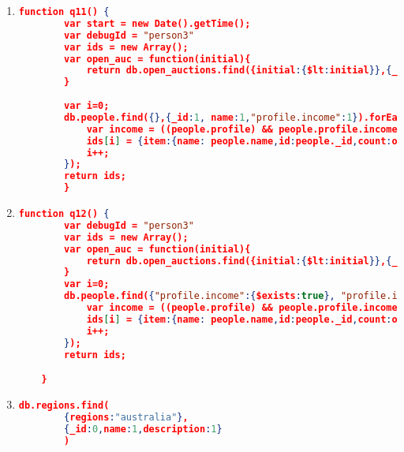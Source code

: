 \begin{enumerate}[label=Q\arabic*]
\begin{lstlisting}[language=JSON,   basicstyle=\scriptsize]
    			})
    		return prof;
    		};
        
        var ids = new Array();
    	var i = 0;
    	var allcategories = new Array();
    	db.people.aggregate([
    	{$match:{"profile.interest":{$exists:true}}},
    	{$project:{_id:1, interest:"$profile.interest"}},
    	{$unwind:"$interest"},
    	{$group:{_id:"$interest.category"}},
    	{$project:{_id:0, category:"$_id"}}
    	],{allowDiskUse:true}).forEach(function(people){
    		var catId = people.category;
    		ids[i] = {categorie:{id:catId,profile:getProfileByCategory(catId)}}
    		i++;
    	});
    	return ids;
    
    }
	\end{lstlisting}
	
	
    \item \label{mongodb-q-11}%
	\begin{lstlisting}[language=JSON,   basicstyle=\scriptsize]
	  function q11() {
    	var start = new Date().getTime();
    	var debugId = "person3"
    	var ids = new Array();
    	var open_auc = function(initial){
    		return db.open_auctions.find({initial:{$lt:initial}},{_id:1}).count();
    	}
    	
    	var i=0;
    	db.people.find({},{_id:1, name:1,"profile.income":1}).forEach(function(people){
    		var income = ((people.profile) && people.profile.income)? people.profile.income/5000:0;
    		ids[i] = {item:{name: people.name,id:people._id,count:open_auc(income)}};
    		i++;
    	});
    	return ids;
        }
	\end{lstlisting}
	
	
    \item \label{mongodb-q-12}%
	\begin{lstlisting}[language=JSON,   basicstyle=\scriptsize]
	   function q12() {
    	var debugId = "person3"
    	var ids = new Array();
    	var open_auc = function(initial){
    		return db.open_auctions.find({initial:{$lt:initial}},{_id:1}).count();
    	}
    	var i=0;
    	db.people.find({"profile.income":{$exists:true}, "profile.income":{$gt:50000}},{_id:1, name:1,"profile.income":1}).forEach(function(people){
    		var income = ((people.profile) && people.profile.income)? people.profile.income/5000:0;
    		ids[i] = {item:{name: people.name,id:people._id,count:open_auc(income)}};
    		i++;
    	});
    	return ids;

    }
	\end{lstlisting}
	
	\item \label{mongodb-q-13}%
	\begin{lstlisting}[language=JSON,   basicstyle=\scriptsize]
	    db.regions.find(
		{regions:"australia"},
		{_id:0,name:1,description:1}
        )
	\end{lstlisting}
	

\end{enumerate}
